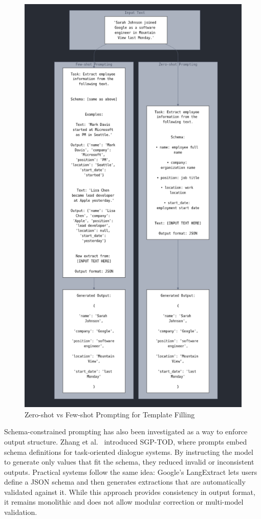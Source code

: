 \begin{figure}
    \centering
    \includegraphics[width=0.8\linewidth]{images/zero_shot_vs_few_shot.png}
    \caption{Zero-shot vs Few-shot Prompting for Template Filling}
    \label{fig:placeholder}
\end{figure}

Schema-constrained prompting has also been investigated as a way to enforce output structure. Zhang et al.\ \cite{zhang2023sgptod} introduced SGP-TOD, where prompts embed schema definitions for task-oriented dialogue systems. By instructing the model to generate only values that fit the schema, they reduced invalid or inconsistent outputs. Practical systems follow the same idea: Google’s LangExtract \cite{google2024langextract} lets users define a JSON schema and then generates extractions that are automatically validated against it. While this approach provides consistency in output format, it remains monolithic and does not allow modular correction or multi-model validation.

